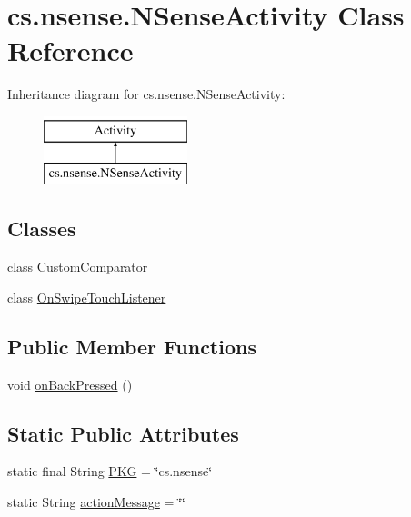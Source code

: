 \hypertarget{classcs_1_1nsense_1_1_n_sense_activity}{\section{cs.\-nsense.\-N\-Sense\-Activity Class Reference}
\label{classcs_1_1nsense_1_1_n_sense_activity}
}
Inheritance diagram for cs.\-nsense.\-N\-Sense\-Activity\-:\begin{figure}[H]
\begin{center}
\leavevmode
\includegraphics[height=2.000000cm]{classcs_1_1nsense_1_1_n_sense_activity}
\end{center}
\end{figure}
\subsection*{Classes}
\begin{DoxyCompactItemize}
\item 
class \hyperlink{classcs_1_1nsense_1_1_n_sense_activity_1_1_custom_comparator}{Custom\-Comparator}
\item 
class \hyperlink{classcs_1_1nsense_1_1_n_sense_activity_1_1_on_swipe_touch_listener}{On\-Swipe\-Touch\-Listener}
\end{DoxyCompactItemize}
\subsection*{Public Member Functions}
\begin{DoxyCompactItemize}
\item 
void \hyperlink{classcs_1_1nsense_1_1_n_sense_activity_a8db90e69da81505e450f49985383bd50}{on\-Back\-Pressed} ()
\end{DoxyCompactItemize}
\subsection*{Static Public Attributes}
\begin{DoxyCompactItemize}
\item 
static final String \hyperlink{classcs_1_1nsense_1_1_n_sense_activity_a26d527c7425b807ab6eda661541fac0d}{P\-K\-G} = \char`\"{}cs.\-nsense\char`\"{}
\item 
static String \hyperlink{classcs_1_1nsense_1_1_n_sense_activity_ad46d4e3f2db1f93c16851a0eb596974b}{action\-Message} = \char`\"{}\char`\"{}
\end{DoxyCompactItemize}
